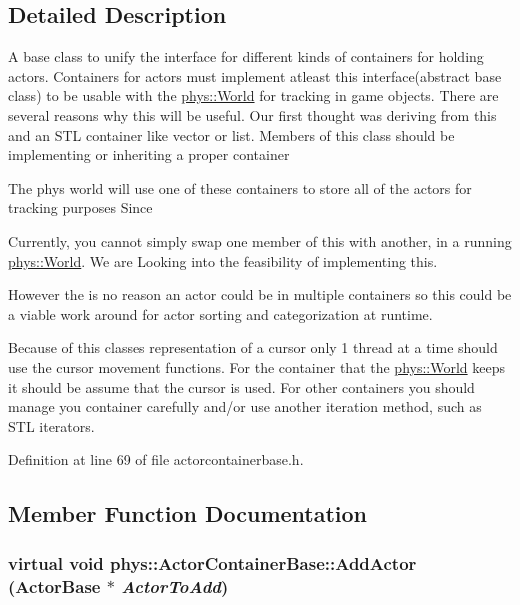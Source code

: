\subsection{Detailed Description}
A base class to unify the interface for different kinds of containers for holding actors. Containers for actors must implement atleast this interface(abstract base class) to be usable with the \hyperlink{classphys_1_1World}{phys::World} for tracking in game objects. There are several reasons why this will be useful. Our first thought was deriving from this and an STL container like vector or list. Members of this class should be implementing or inheriting a proper container\par
\par
 The phys world will use one of these containers to store all of the actors for tracking purposes Since \par
\par
 Currently, you cannot simply swap one member of this with another, in a running \hyperlink{classphys_1_1World}{phys::World}. We are Looking into the feasibility of implementing this. \par
\par
 However the is no reason an actor could be in multiple containers so this could be a viable work around for actor sorting and categorization at runtime. \par
\par
 Because of this classes representation of a cursor only 1 thread at a time should use the cursor movement functions. For the container that the \hyperlink{classphys_1_1World}{phys::World} keeps it should be assume that the cursor is used. For other containers you should manage you container carefully and/or use another iteration method, such as STL iterators. 

Definition at line 69 of file actorcontainerbase.h.



\subsection{Member Function Documentation}
\hypertarget{classphys_1_1ActorContainerBase_a8dd213cba4915f68ac421fc9f341cbbe}{
\subsubsection[{AddActor}]{\setlength{\rightskip}{0pt plus 5cm}virtual void phys::ActorContainerBase::AddActor ({\bf ActorBase} $\ast$ {\em ActorToAdd})}}
\label{d1/d00/classphys_1_1ActorContainerBase_a8dd213cba4915f68ac421fc9f341cbbe}


